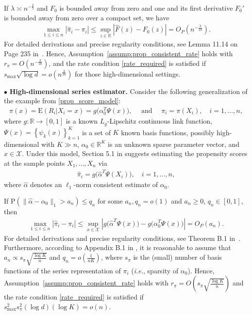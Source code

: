 \documentclass[ejsv2,noshowframe]{imsart}
\theoremstyle{plain}
\theoremstyle{definition}
\theoremstyle{remark}
\renewcommand{\hat}{\widehat}
\begin{document}
If $\lambda \asymp n^{-\frac{2}{5}}$ and $F_0$ is bounded away from zero and one and its first derivative $F_0'$ is bounded away from zero over a compact set, we have
\begin{align*}
	\max_{1\leq i\leq n}\left|\hat{\pi}_i -\pi_i \right| \leq \sup_{z \in \mathbb{R}} |\hat{F}(z) - F_0(z)| = O_P\left(n^{-\frac{3}{10}}\right).
\end{align*}
For detailed derivations and precise regularity conditions, see Lemma 11.14 on Page 235 in~\cite{geer2000empirical}.
Hence, Assumption~\ref{assump:prop_consistent_rate} holds with $r_\pi = O\left(n^{-\frac{3}{10}} \right)$, and the rate condition \eqref{rate_required} is satisfied if $s_{\max} \sqrt{\log d} = o\left(n^{\frac{3}{10}} \right)$ for those high-dimensional settings.

$\bullet$ \textbf{High-dimensional series estimator.} Consider the following generalization of the example from \eqref{prop_score_model}:
\begin{align*}
	\pi(x) = \mathrm{E}(R_i|X_i = x) =  g\big(\alpha_0^T \Psi(x)\big), \quad \text{ and } \quad \pi_i=\pi(X_i), \quad i = 1, \ldots, n,  
\end{align*}
where $g : \mathbb{R} \rightarrow [0,1]$ is a known $L_g$-Lipschitz continuous link function, $\Psi(x) = \left\{\psi_k(x) \right\}_{k=1}^K$ is a set of $K$ known basis functions, possibly high-dimensional with $K \gg n$, $\alpha_0 \in \mathbb{R}^K$ is an unknown sparse parameter vector, and $x \in \mathcal{X}$. Under this model, Section 5.1 in \cite{chakrabortty2019high} suggests estimating the propensity scores at the sample points $X_1,...,X_n$ via
\begin{align*}
	\hat{\pi}_i = g\big(\hat{\alpha}^T\Psi(X_i)\big), \quad i= 1, \ldots, n,
\end{align*}
where $\hat{\alpha}$ denotes an $\ell_1$-norm consistent estimate of $\alpha_0$. 

If $\mathrm{P} \left(\|\hat{\alpha} - \alpha_0\|_1 > a_n \right) \leq q_n$ for some $a_n, q_n= o(1)$ and $a_n \geq 0$, $q_n \in [0,1]$, then
\begin{align*}
	\max_{1\leq i\leq n}\left|\hat{\pi}_i -\pi_i \right| \leq \sup_{x \in \mathcal{X}} \left| g\big(\hat{\alpha}^T\Psi(x)\big) - g\big(\alpha_0^T\Psi(x)\big) \right| = O_P(a_n).
\end{align*}
For detailed derivations and precise regularity conditions, see Theorem B.1 in~\cite{chakrabortty2019high}.
Furthermore, according to Appendix B.1 in \cite{chakrabortty2019high}, it is reasonable to assume that $a_n \propto s_\pi \sqrt{\frac{\log K}{n}} $ and $q_n = o\left(\frac{1}{nK} \right)$, where $s_\pi$ is the (small) number of basis functions of the series representation of $\pi_i$ (\emph{i.e.}, sparsity of $\alpha_0$). Hence, Assumption~\ref{assump:prop_consistent_rate} holds with $r_\pi = O\left(s_\pi \sqrt{\frac{\log K}{n}}\right)$ and the rate condition \eqref{rate_required} is satisfied if $s_{\max}^2 s_\pi^2 (\log d) (\log K) = o(n)$.
\end{document}
